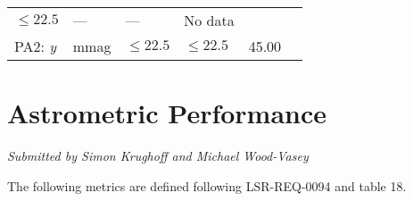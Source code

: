 \documentclass[DM,lsstdraft,toc]{lsstdoc}
\begin{document}
\begin{longtable}[]{@{}llllll@{}}
\begin{minipage}[t]{0.17\columnwidth}
\(\leq 22.5\)\strut
\end{minipage} & \begin{minipage}[t]{0.17\columnwidth}\raggedright\strut
---\strut
\end{minipage} & \begin{minipage}[t]{0.12\columnwidth}\raggedright\strut
---\strut
\end{minipage} & \begin{minipage}[t]{0.17\columnwidth}\raggedright\strut
No data\strut
\end{minipage}\tabularnewline
\begin{minipage}[t]{0.14\columnwidth}\raggedright\strut
PA2: \emph{y}\strut
\end{minipage} & \begin{minipage}[t]{0.06\columnwidth}\raggedright\strut
mmag\strut
\end{minipage} & \begin{minipage}[t]{0.17\columnwidth}\raggedright\strut
\(\leq 22.5\)\strut
\end{minipage} & \begin{minipage}[t]{0.17\columnwidth}\raggedright\strut
\(\leq 22.5\)\strut
\end{minipage} & \begin{minipage}[t]{0.12\columnwidth}\raggedright\strut
45.00\strut
\end{minipage} & \begin{minipage}[t]{0.17\columnwidth}\raggedright\strut
\strut
\end{minipage}\tabularnewline
\bottomrule
\end{longtable}

\section{Astrometric Performance}\label{astrometric-performance}

\emph{Submitted by Simon Krughoff and Michael Wood-Vasey}

The following metrics are defined following LSR-REQ-0094
 and  table 18.
\end{document}
